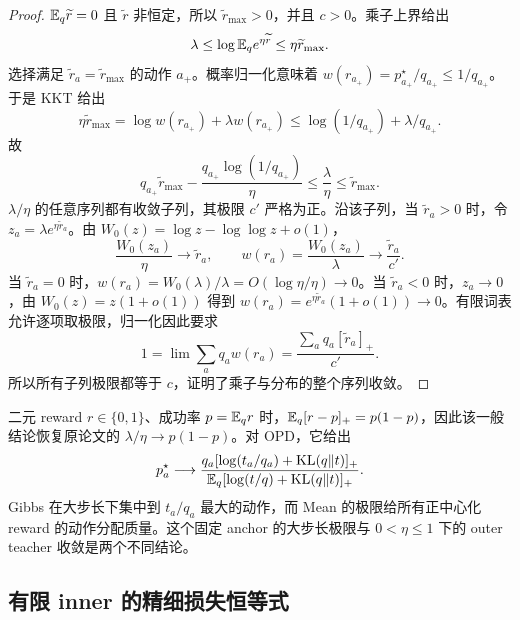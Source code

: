 \begin{proof}
$\mathbb E_q\widetilde r=0$ 且  $\widetilde r$ 非恒定，所以 $\widetilde r_{\max}>0$，并且 $c>0$。乘子上界给出
\begin{equation*}
 \lambda\le\log\mathbb E_qe^{\eta\widetilde r}\le\eta \widetilde r_{\max}.
\end{equation*}
选择满足 $\widetilde r_a=\widetilde r_{\max}$ 的动作 $a_+$。概率归一化意味着 $w(r_{a_+})=p_{a_+}^\star/q_{a_+}\le1/q_{a_+}$。于是 KKT 给出
\begin{equation*}
 \eta \widetilde r_{\max}
 =\log w(r_{a_+})+\lambda w(r_{a_+})
 \le\log(1/q_{a_+})+\lambda/q_{a_+}.
\end{equation*}
故
\begin{equation*}
 q_{a_+}\widetilde r_{\max}-\frac{q_{a_+}\log(1/q_{a_+})}{\eta}
 \le\frac{\lambda}{\eta}\le \widetilde r_{\max}.
\end{equation*}
$\lambda/\eta$ 的任意序列都有收敛子列，其极限 $c'$ 严格为正。沿该子列，当 $\widetilde r_a>0$ 时，令 $z_a=\lambda e^{\eta \widetilde r_a}$。由 $W_0(z)=\log z-\log\log z+o(1)$，
\begin{equation*}
 \frac{W_0(z_a)}{\eta}\to \widetilde r_a,
 \qquad w(r_a)=\frac{W_0(z_a)}{\lambda}\to\frac{\widetilde r_a}{c'}.
\end{equation*}
当 $\widetilde r_a=0$ 时，$w(r_a)=W_0(\lambda)/\lambda=O(\log\eta/\eta)\to0$。当 $\widetilde r_a<0$ 时，$z_a\to0$，由 $W_0(z)=z(1+o(1))$ 得到 $w(r_a)=e^{\eta \widetilde r_a}(1+o(1))\to0$。有限词表允许逐项取极限，归一化因此要求
\begin{equation*}
 1=\lim\sum_aq_aw(r_a)=\frac{\sum_aq_a[\widetilde r_a]_+}{c'}.
\end{equation*}
所以所有子列极限都等于 $c$，证明了乘子与分布的整个序列收敛。
\end{proof}

二元 reward $r\in\{0,1\}$、成功率 $p=\mathbb E_qr$ 时，$\mathbb E_q[r-p]_+=p(1-p)$，因此该一般结论恢复原论文的 $\lambda/\eta\to p(1-p)$。对 OPD，它给出
\begin{equation*}
 p_a^\star\longrightarrow
 \frac{q_a[\log(t_a/q_a)+\operatorname{KL}(q\Vert t)]_+}
 {\mathbb E_q[\log(t/q)+\operatorname{KL}(q\Vert t)]_+}.
\end{equation*}
Gibbs 在大步长下集中到 $t_a/q_a$ 最大的动作，而 Mean 的极限给所有正中心化 reward 的动作分配质量。这个固定 anchor 的大步长极限与 $0<\eta\le1$ 下的 outer teacher 收敛是两个不同结论。

\subsection{有限 inner 的精细损失恒等式}

